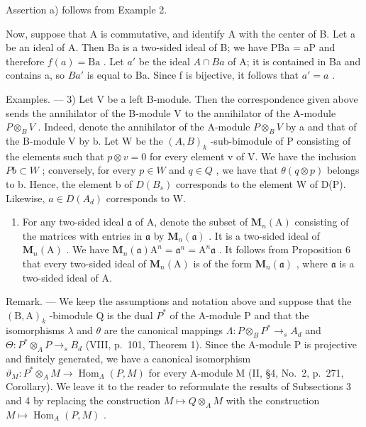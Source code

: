 Assertion a) follows from Example 2.

Now, suppose that A is commutative, and identify A with the center of B. Let a be an ideal of A. Then Ba is a two-sided ideal of B; we have PBa = aP and therefore \(f(a) = \text{Ba}\) . Let \(a'\) be the ideal \(A \cap Ba\) of A; it is contained in Ba and contains a, so \(Ba'\) is equal to Ba. Since f is bijective, it follows that \(a' = a\) .

Examples. --- 3) Let V be a left B-module. Then the correspondence given above sends the annihilator of the B-module V to the annihilator of the A-module \(P \otimes_{B} V\) . Indeed, denote the annihilator of the A-module \(P \otimes_{B} V\) by a and that of the B-module V by b. Let W be the \((A, B)_{k}\) -sub-bimodule of P consisting of the elements such that \(p \otimes v = 0\) for every element v of V. We have the inclusion \(Pb \subset W\) ; conversely, for every \(p \in W\) and \(q \in Q\) , we have that \(\theta(q \otimes p)\) belongs to b. Hence, the element b of \(D(B_s)\) corresponds to the element W of D(P). Likewise, \(a \in D(A_d)\) corresponds to W.

\begin{enumerate}
\def\labelenumi{\arabic{enumi})}
\setcounter{enumi}{3}
\tightlist
\item
  For any two-sided ideal \(\mathfrak{a}\) of A, denote the subset of \(\mathbf{M}_n(\mathrm{A})\) consisting of the matrices with entries in \(\mathfrak{a}\) by \(\mathbf{M}_n(\mathfrak{a})\) . It is a two-sided ideal of \(\mathbf{M}_n(\mathrm{A})\) . We have \(\mathbf{M}_n(\mathfrak{a})\mathrm{A}^n = \mathfrak{a}^n = \mathrm{A}^n\mathfrak{a}\) . It follows from Proposition 6 that every two-sided ideal of \(\mathbf{M}_n(\mathrm{A})\) is of the form \(\mathbf{M}_n(\mathfrak{a})\) , where \(\mathfrak{a}\) is a two-sided ideal of A.
\end{enumerate}

Remark. --- We keep the assumptions and notation above and suppose that the \((\mathrm{B},\mathrm{A})_{k}\) -bimodule Q is the dual \(P^{*}\) of the A-module P and that the isomorphisms \(\lambda\) and \(\theta\) are the canonical mappings \(\Lambda:P\otimes_{B}P^{*}\to_{s}A_{d}\) and \(\Theta:P^{*}\otimes_{A}P\to_{s}B_{d}\) (VIII, p.~101, Theorem 1). Since the A-module P is projective and finitely generated, we have a canonical isomorphism \(\vartheta_{M}:P^{*}\otimes_{A}M\to\operatorname{Hom}_{A}(P,M)\) for every A-module M (II, §4, No.~2, p.~271, Corollary). We leave it to the reader to reformulate the results of Subsections 3 and 4 by replacing the construction \(M\mapsto Q\otimes_{A}M\) with the construction \(M\mapsto\operatorname{Hom}_{A}(P,M)\) .

